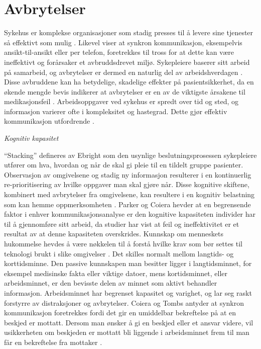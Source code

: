 \section{Avbrytelser}
\label{chp: avbrytelser} 

Sykehus er komplekse organisasjoner som stadig presses til å levere sine tjenester så effektivt som mulig \cite{Scholl07}. Likevel viser \cite{Scholl07, Parker00} at synkron kommunikasjon, eksempelvis ansikt-til-ansikt eller per telefon, foretrekkes til tross for at dette kan være ineffektivt og forårsaker et avbruddsdrevet miljø.
Sykepleiere baserer sitt arbeid på samarbeid, og avbrytelser er dermed en naturlig del av arbeidshverdagen \cite{Bardram04}. Disse avbruddene kan ha betydelige, skadelige effekter på pasientsikkerhet, da en økende mengde bevis indikerer at avbrytelser er en av de viktigste årsakene til medikasjonsfeil \cite{McGillis10, Parker00}. Arbeidsoppgaver ved sykehus er spredt over tid og sted, og informasjon varierer ofte i kompleksitet og hastegrad. Dette gjør effektiv kommunikasjon utfordrende \cite{KlemetsRedundancy}. 

\noindent
\emph{Kognitiv kapasitet}

\noindent
“Stacking” defineres av Ebright som den usynlige beslutningsprosessen sykepleiere utfører om hva, hvordan og når de skal gi pleie til en tildelt gruppe pasienter. Observasjon av omgivelsene og stadig ny informasjon resulterer i en kontinuerlig re-prioritisering av hvilke oppgaver man skal gjøre når. Disse kognitive skiftene, kombinert med avbrytelser fra omgivelsene, kan resultere i en kognitiv belastning som kan hemme oppmerksomheten \cite{Ebright10}. Parker og Coiera hevder at en begrensende faktor i enhver kommunikasjonsanalyse er den kognitive kapasiteten individer har til å gjennomføre sitt arbeid, da studier har vist at feil og ineffektivitet er et resultat av at denne kapasiteten overskrides. Kunnskap om menneskets hukommelse hevdes å være nøkkelen til å forstå hvilke krav som bør settes til teknologi brukt i slike omgivelser \cite{Parker00}.
Det skilles normalt mellom langtids- og korttidsminne. Den passive kunnskapen man besitter ligger i langtidsminnet, for eksempel medisinske fakta eller viktige datoer, mens kortidsminnet, eller arbeidsminnet, er den bevisste delen av minnet som aktivt behandler informasjon. Arbeidsminnet har begrenset kapasitet og varighet, og lar seg raskt forstyrre av distraksjoner og avbrytelser. Coiera og Tombs antyder at synkron kommunikasjon foretrekkes fordi det gir en umiddelbar bekreftelse på at en beskjed er mottatt. Dersom man ønsker å gi en beskjed eller et ansvar videre, vil usikkerheten om beskjeden er mottatt bli liggende i arbeidsminnet frem til man får en bekreftelse fra mottaker \cite{Parker00}.
 
